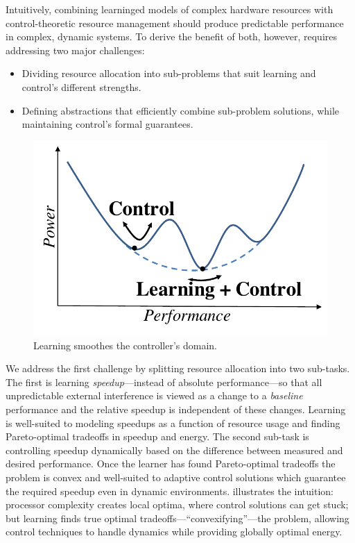 Intuitively, combining learninged models of complex hardware resources
with control-theoretic resource management should produce predictable
performance in complex, dynamic systems.  To derive the benefit of
both, however, requires addressing two major challenges:
\begin{itemize}[leftmargin=1.5em]
\item Dividing resource allocation into sub-problems that suit
  learning and control's different strengths.
\item Defining abstractions that efficiently combine sub-problem
  solutions, while maintaining control's formal guarantees.
\end{itemize}

\begin{figure}
\centering
\includegraphics[width=.35\columnwidth]{figures/learning_control_doodle.pdf}
\caption{Learning smoothes the controller's domain.}
\label{fig:learning-control-doodle}
\end{figure}
We address the first challenge by splitting resource allocation into
two sub-tasks.  The first is learning \emph{speedup}---instead of
absolute perf\-ormance---so that all unpredictable external
interference is viewed as a change to a \emph{baseline} performance
and the relative speedup is independent of these changes.  Learning is
well-suited to modeling speedups as a function of resource usage and
finding Pareto-optimal tradeoffs in speedup and energy.  The second
sub-task is controlling speedup dynamically based on the difference
between measured and desired performance.  Once the learner has found
Pareto-optimal tradeoffs the problem is convex and well-suited to
adaptive control solutions which guarantee the required speedup even
in dynamic environments.
illustrates the intuition: processor complexity creates local optima,
where control solutions can get stuck; but learning finds true optimal
tradeoffs---``convexifying''---the problem, allowing control
techniques to handle dynamics while providing globally optimal energy.


